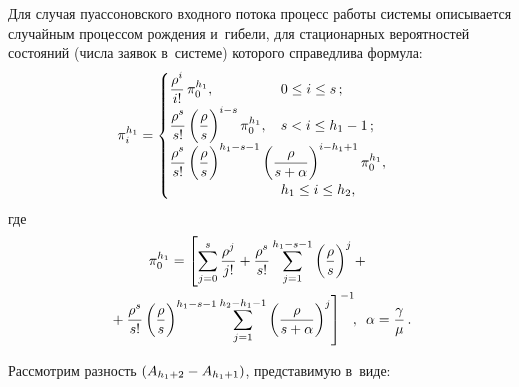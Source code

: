 \begin{multicols}{2}
  Для случая пуассоновского входного потока процесс работы сис\-те\-мы 
описывается случайным процессом рож\-де\-ния и~гибели, для стационарных 
вероятностей со\-сто\-яний (чис\-ла заявок в~сис\-те\-ме) которого справедлива 
формула:
  $$
  \pi_i^{h_1} =\begin{cases}
  \fr{\rho^i}{i!}\,\pi_0^{h_1}, & \hspace*{-30mm}0\leq i\leq s\,;\\
  \fr{\rho^s}{s!} \left( \fr{\rho}{s}\right)^{i-s} \pi_0^{h_1}, & \hspace*{-30mm}s<i\leq h_1-1\,;\\
  \fr{\rho^s}{s!}\left(\fr{\rho}{s}\right)^{h_1-s-1} \left( 
\fr{\rho}{s+\alpha}\right)^{i-h_1+1} \pi_0^{h_1}, &\\
& \hspace*{-30mm}h_1\leq i\leq h_2,
  \end{cases}
  $$
где 
\begin{multline*}
\pi_0^{h_1} =\left[ \sum\limits^s_{j=0} \displaystyle\frac{\displaystyle \rho^j\mathstrut}{\displaystyle j!\mathstrut} +\displaystyle\frac{\displaystyle \rho^s\mathstrut}{\displaystyle s!\mathstrut} 
\sum\limits_{j=1}^{h_1-s-1} \left( \displaystyle\frac{\displaystyle \rho\mathstrut}{\displaystyle s\mathstrut}\right)^j +{}\right.\\
\left.{}+ \displaystyle\frac{\displaystyle \rho^s\mathstrut}{\displaystyle s!\mathstrut} \left( \displaystyle\frac{\displaystyle \rho\mathstrut}{\displaystyle s\mathstrut}\right)^{h_1-s-1} 
\sum\limits_{j=1}^{h_2-h_1-1} \left( \displaystyle\frac{\displaystyle \rho\mathstrut}{\displaystyle s+\alpha\mathstrut}\right)^j \right]^{-1}\!\!,\enskip
\alpha=\displaystyle\frac{\displaystyle \gamma\mathstrut}{\displaystyle \mu\mathstrut}\,.
\end{multline*}
  
  Рассмотрим раз\-ность $\left( A_{h_1+2}\hm- A_{h_1+1}\right)$, пред\-ста\-ви\-мую 
в~виде:


\end{multicols}
